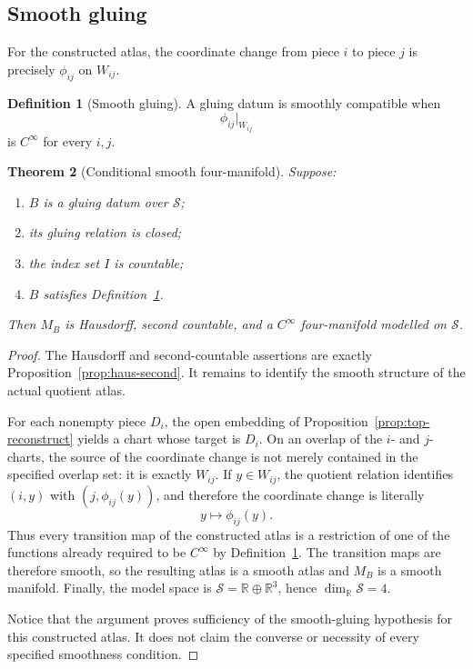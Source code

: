 \documentclass[11pt,a4paper]{article}
\newtheorem{theorem}{Theorem}[section]
\theoremstyle{definition}
\newtheorem{definition}[theorem]{Definition}
\theoremstyle{remark}
\newcommand{\R}{\mathbb{R}}
\newcommand{\Smodel}{\mathcal{S}}
\begin{document}
\subsection{Smooth gluing}

For the constructed atlas, the coordinate change from piece \(i\) to
piece \(j\) is precisely \(\phi_{ij}\) on \(W_{ij}\).

\begin{definition}[Smooth gluing]
\label{def:smoothgluing}
A gluing datum is smoothly compatible when
\[
   \phi_{ij}|_{W_{ij}}
\]
is \(C^\infty\) for every \(i,j\).
\end{definition}

\begin{theorem}[Conditional smooth four-manifold]
\label{thm:smooth-manifold}
Suppose:
\begin{enumerate}
\item \(B\) is a gluing datum over \(\Smodel\);
\item its gluing relation is closed;
\item the index set \(I\) is countable;
\item \(B\) satisfies Definition~\ref{def:smoothgluing}.
\end{enumerate}
Then \(M_B\) is Hausdorff, second countable, and a \(C^\infty\)
four-manifold modelled on \(\Smodel\).
\end{theorem}

\begin{proof}
The Hausdorff and second-countable assertions are exactly
Proposition~\ref{prop:haus-second}.  It remains to identify the smooth structure of
the actual quotient atlas.

For each nonempty piece \(D_i\), the open embedding of
Proposition~\ref{prop:top-reconstruct} yields a chart whose target is \(D_i\).  On an
overlap of the \(i\)- and \(j\)-charts, the source of the coordinate change
is not merely contained in the specified overlap set: it is exactly
\(W_{ij}\).  If \(y\in W_{ij}\), the quotient relation identifies
\((i,y)\) with \((j,\phi_{ij}(y))\), and therefore the coordinate change is
literally
\[
     y\longmapsto\phi_{ij}(y).
\]
Thus every transition map of the constructed atlas is a restriction of
one of the functions already required to be \(C^\infty\) by
Definition~\ref{def:smoothgluing}.  The transition maps are therefore smooth, so the resulting atlas is a smooth atlas and \(M_B\) is a smooth manifold.
Finally, the model space is
\(\Smodel=\R\oplus\R^3\), hence \(\dim_{\R}\Smodel=4\).

Notice that the argument proves sufficiency of the smooth-gluing
hypothesis for this constructed atlas.  It does not claim the converse or
necessity of every specified smoothness condition.
\end{proof}
\end{document}
